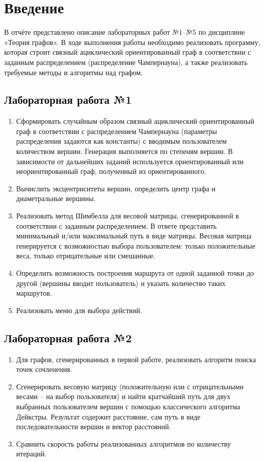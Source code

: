 \section*{Введение}

В отчёте представлено описание лабораторных работ №1–№5 по дисциплине «Теория графов». 
В ходе выполнения работы необходимо реализовать программу, которая строит связный ациклический ориентированный граф в соответствии с заданным распределением (распределение Чампернауна), а также реализовать требуемые методы и алгоритмы над графом.

\subsection*{Лабораторная работа №1}
\begin{enumerate}
	\item Сформировать случайным образом связный ациклический ориентированный граф в соответствии с распределением Чампернауна (параметры распределения задаются как константы) с вводимым пользователем количеством вершин. Генерация выполняется по степеням вершин. В зависимости от дальнейших заданий используется ориентированный или неориентированный граф, полученный из ориентированного.
	\item Вычислить эксцентриситеты вершин, определить центр графа и диаметральные вершины.
	\item Реализовать метод Шимбелла для весовой матрицы, сгенерированной в соответствии с заданным распределением. В ответе представить минимальный и/или максимальный путь в виде матрицы. Весовая матрица генерируется с возможностью выбора пользователем: только положительные веса, только отрицательные или смешанные.
	\item Определить возможность построения маршрута от одной заданной точки до другой (вершины вводит пользователь) и указать количество таких маршрутов.
	\item Реализовать меню для выбора действий.
\end{enumerate}

\subsection*{Лабораторная работа №2}
\begin{enumerate}
	\item Для графов, сгенерированных в первой работе, реализовать алгоритм поиска точек сочленения.
	\item Сгенерировать весовую матрицу (положительную или с отрицательными весами – на выбор пользователя) и найти кратчайший путь для двух выбранных пользователем вершин с помощью классического алгоритма Дейкстры. Результат содержит расстояние, сам путь в виде последовательности вершин и вектор расстояний.
	\item Сравнить скорость работы реализованных алгоритмов по количеству итераций.
\end{enumerate}

